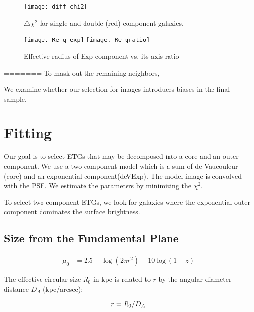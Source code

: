 \documentclass[iop]{emulateapj}
\newcommand{\chisq}{\ensuremath{\chi^2}}
\newcommand\todo[1]{\textcolor{red}{#1}}
\begin{document}
\begin{figure}[]
    \begin{center}
        \texttt{[image: diff\_chi2]}
    \end{center}
    \caption{$\triangle\chisq$ for single and double (red) component galaxies.}
    \label{fig:DiffChisq}
\end{figure}

\begin{figure*}[]
    \begin{center}
        \texttt{[image: Re\_q\_exp]}
        \texttt{[image: Re\_qratio]}
    \end{center}
    \caption{Effective radius of Exp component vs. its axis ratio}
    \label{fig:Req}
\end{figure*}
=======
To mask out the remaining neighbors, 

We examine whether our selection for images introduces biases
in the final sample.

\section{Fitting}

Our goal is to select ETGs that may be decomposed into a core and an outer
component.
We use a two component model which is a sum of de Vaucouleur (core)
and an exponential component(deVExp).
The model image is convolved with the PSF.
We estimate the parameters by minimizing the \chisq.

To select two component ETGs, we look for galaxies where the exponential
outer component dominates the surface brightness. 

\subsection{Size from the Fundamental Plane}
\todo{}

\begin{eqnarray}
       \mu_0 &= 2.5 + \log(2 \pi r^2) - 10 \log(1+z)
\end{eqnarray}

The effective circular size $R_0$ in kpc is related to $r$ by
the angular diameter distance $D_A$ (kpc/arcsec):

\begin{equation}
    r = R_0 / D_A \\
\end{equation}
\end{document}
